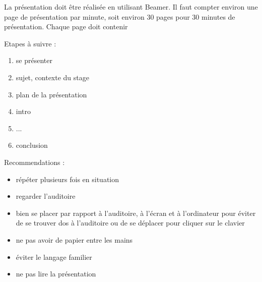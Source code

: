 


La présentation doit être réalisée en utilisant Beamer.
Il faut compter environ une page de présentation par minute, soit environ 30 pages pour 30 minutes de présentation.
Chaque page doit contenir 


Etapes à suivre :
\begin{enumerate}
\item se présenter
\item sujet, contexte du stage
\item plan de la présentation
\item intro
\item ...
\item conclusion
\end{enumerate}

Recommendations :
\begin{itemize}
\item répéter plusieurs fois en situation
\item regarder l'auditoire
\item bien se placer par rapport à l'auditoire, à l'écran et à l'ordinateur pour éviter de se trouver dos à l'auditoire ou de se déplacer pour cliquer sur le clavier
\item ne pas avoir de papier entre les mains
\item éviter le langage familier
\item ne pas lire la présentation
\end{itemize}
